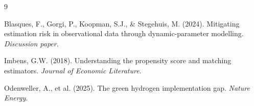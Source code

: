 \documentclass[11pt,a4paper]{article}
\begin{document}
\begin{thebibliography}{9}

Blasques, F., Gorgi, P., Koopman, S.J., \& Stegehuis, M. (2024). Mitigating estimation risk in observational data through dynamic-parameter modelling. \emph{Discussion paper}.

Imbens, G.W. (2018). Understanding the propensity score and matching estimators. \emph{Journal of Economic Literature}.

Odenweller, A., et al. (2025). The green hydrogen implementation gap. \emph{Nature Energy}.

\end{thebibliography}
\end{document}
